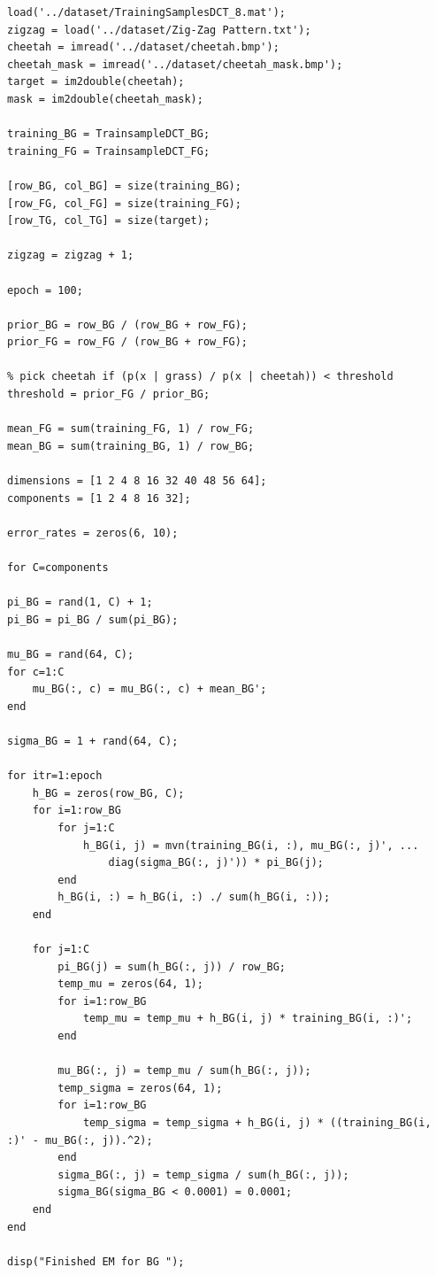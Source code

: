 \documentclass{article}
\begin{document}
\begin{lstlisting}
load('../dataset/TrainingSamplesDCT_8.mat');
zigzag = load('../dataset/Zig-Zag Pattern.txt');
cheetah = imread('../dataset/cheetah.bmp');
cheetah_mask = imread('../dataset/cheetah_mask.bmp');
target = im2double(cheetah);
mask = im2double(cheetah_mask);

training_BG = TrainsampleDCT_BG;
training_FG = TrainsampleDCT_FG;

[row_BG, col_BG] = size(training_BG);
[row_FG, col_FG] = size(training_FG);
[row_TG, col_TG] = size(target);

zigzag = zigzag + 1;

epoch = 100;

prior_BG = row_BG / (row_BG + row_FG);
prior_FG = row_FG / (row_BG + row_FG);

% pick cheetah if (p(x | grass) / p(x | cheetah)) < threshold
threshold = prior_FG / prior_BG;

mean_FG = sum(training_FG, 1) / row_FG;
mean_BG = sum(training_BG, 1) / row_BG;

dimensions = [1 2 4 8 16 32 40 48 56 64];
components = [1 2 4 8 16 32];

error_rates = zeros(6, 10);

for C=components

pi_BG = rand(1, C) + 1;
pi_BG = pi_BG / sum(pi_BG);

mu_BG = rand(64, C);
for c=1:C
    mu_BG(:, c) = mu_BG(:, c) + mean_BG';
end

sigma_BG = 1 + rand(64, C);

for itr=1:epoch
    h_BG = zeros(row_BG, C);
    for i=1:row_BG
        for j=1:C
            h_BG(i, j) = mvn(training_BG(i, :), mu_BG(:, j)', ...
                diag(sigma_BG(:, j)')) * pi_BG(j);
        end
        h_BG(i, :) = h_BG(i, :) ./ sum(h_BG(i, :));
    end

    for j=1:C
        pi_BG(j) = sum(h_BG(:, j)) / row_BG;
        temp_mu = zeros(64, 1);
        for i=1:row_BG
            temp_mu = temp_mu + h_BG(i, j) * training_BG(i, :)';
        end
        
        mu_BG(:, j) = temp_mu / sum(h_BG(:, j));
        temp_sigma = zeros(64, 1);
        for i=1:row_BG
            temp_sigma = temp_sigma + h_BG(i, j) * ((training_BG(i, :)' - mu_BG(:, j)).^2);
        end
        sigma_BG(:, j) = temp_sigma / sum(h_BG(:, j));
        sigma_BG(sigma_BG < 0.0001) = 0.0001;
    end
end

disp("Finished EM for BG ");


\end{lstlisting}
\end{document}
